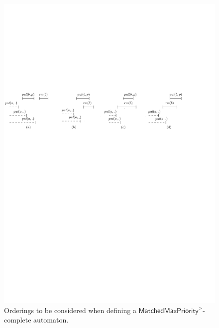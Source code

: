 \begin{figure}[t]
  \centering
  \includegraphics[width=.8\textwidth]{figures/PIC_HIS_PQ1Lar-fouCase.pdf}
  \caption{Orderings to be considered when defining a $\mathsf{MatchedMaxPriority}^>$-complete automaton.}
  \label{fig:executions APQ1Lar-1 in paper}
\end{figure}

